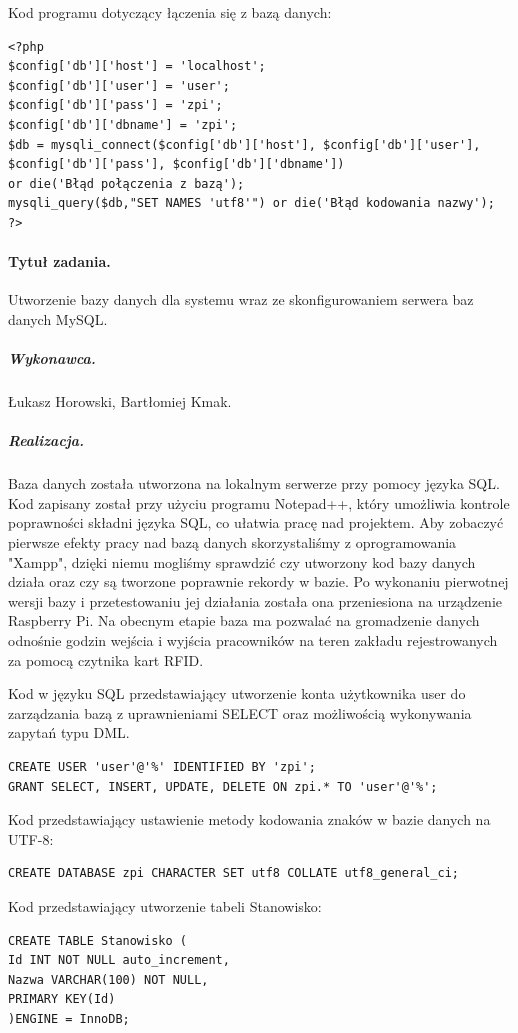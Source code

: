 \documentclass[a4paper]{article}
\begin{document}
Kod programu dotyczący łączenia się z bazą danych:
\begin{verbatim}
<?php
$config['db']['host'] = 'localhost';
$config['db']['user'] = 'user';
$config['db']['pass'] = 'zpi';
$config['db']['dbname'] = 'zpi';
$db = mysqli_connect($config['db']['host'], $config['db']['user'], 
$config['db']['pass'], $config['db']['dbname']) 
or die('Błąd połączenia z bazą');
mysqli_query($db,"SET NAMES 'utf8'") or die('Błąd kodowania nazwy');
?>
\end{verbatim}

\paragraph{Tytuł zadania.} Utworzenie bazy danych dla systemu wraz ze skonfigurowaniem serwera baz danych MySQL.
\subparagraph{Wykonawca.} Łukasz Horowski, Bartłomiej Kmak.
\subparagraph{Realizacja.} Baza danych została utworzona na lokalnym serwerze przy pomocy języka SQL. Kod zapisany został przy użyciu programu Notepad++, który umożliwia kontrole poprawności składni języka SQL, co ułatwia pracę nad projektem. Aby zobaczyć pierwsze efekty pracy nad bazą danych skorzystaliśmy z oprogramowania "Xampp", dzięki niemu mogliśmy sprawdzić czy utworzony kod bazy danych działa oraz czy są tworzone poprawnie rekordy w bazie. Po wykonaniu pierwotnej wersji bazy i przetestowaniu jej działania została ona przeniesiona na urządzenie Raspberry Pi. Na obecnym etapie baza ma pozwalać na gromadzenie danych odnośnie godzin wejścia i wyjścia pracowników na teren zakładu rejestrowanych za pomocą czytnika kart RFID.  
 
Kod w języku SQL przedstawiający utworzenie konta użytkownika user do zarządzania bazą z uprawnieniami SELECT oraz możliwością wykonywania zapytań typu DML.
\begin{verbatim}
CREATE USER 'user'@'%' IDENTIFIED BY 'zpi';
GRANT SELECT, INSERT, UPDATE, DELETE ON zpi.* TO 'user'@'%';
\end{verbatim}

Kod przedstawiający ustawienie metody kodowania znaków w bazie danych na UTF-8:
\begin{verbatim}
CREATE DATABASE zpi CHARACTER SET utf8 COLLATE utf8_general_ci;
\end{verbatim}

Kod przedstawiający utworzenie tabeli Stanowisko:
\begin{verbatim}
CREATE TABLE Stanowisko (
Id INT NOT NULL auto_increment,
Nazwa VARCHAR(100) NOT NULL,
PRIMARY KEY(Id)
)ENGINE = InnoDB;
\end{verbatim}
\end{document}
